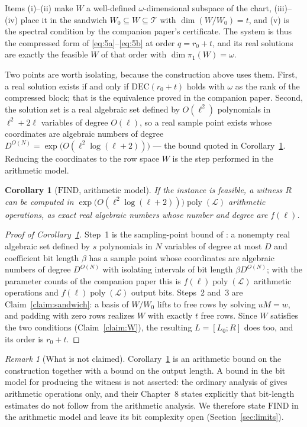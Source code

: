 ﻿\documentclass[journal]{IEEEtran}
\theoremstyle{plainn}
\newtheorem{cor}[thm]{Corollary}
\theoremstyle{remark}
\newtheorem{remark}{Remark}
\begin{document}
Items (i)--(ii) make $W$ a well-defined $\omega$-dimensional subspace of the chart, (iii)--(iv) place it
in the sandwich $W_0\subseteq W\subseteq\mathcal T$ with $\dim(W/W_0)=t$, and (v) is the spectral
condition by the companion paper's certificate. The system is thus the compressed form of
\eqref{eq:5a}--\eqref{eq:5b} at order $q=r_0+t$, and its real solutions are exactly the feasible $W$
of that order with $\dim\pi_1(W)=\omega$.

Two points are worth isolating, because the construction above uses them.
First, a real solution exists if and only if $\mathrm{DEC}(r_0+t)$ holds with $\omega$ as the rank of
the compressed block; that is the equivalence proved in the companion paper. Second, the solution set
is a real algebraic set defined by $O(\ell^2)$ polynomials in $\ell^2+2\ell$ variables of degree
$O(\ell)$, so a real sample point exists whose coordinates are algebraic numbers of degree
$D^{O(N)}=\exp\bigl(O(\ell^2\log(\ell+2))\bigr)$ --- the bound quoted in
Corollary~\ref{cor:find}. Reducing the coordinates to the row space $W$ is the step performed in the
arithmetic model.

\begin{cor}[$\mathrm{FIND}$, arithmetic model]\label{cor:find}
If the instance is feasible, a witness $R$ can be computed in
$\exp\bigl(O(\ell^2\log(\ell+2))\bigr)\operatorname{poly}(\mathcal L)$ arithmetic operations, as
exact real algebraic numbers whose number and degree are $f(\ell)$.
\end{cor}

\begin{proof}[Proof of Corollary~\ref{cor:find}]
Step~1 is the sampling-point bound of \cite[Ch.~13]{bpr06}: a nonempty real algebraic set defined by
$s$ polynomials in $N$ variables of degree at most $D$ and coefficient bit length $\beta$ has a sample
point whose coordinates are algebraic numbers of degree $D^{O(N)}$ with isolating intervals of bit
length $\beta D^{O(N)}$; with the parameter counts of the companion paper this is
$f(\ell)\operatorname{poly}(\mathcal L)$ arithmetic
operations and $f(\ell)\operatorname{poly}(\mathcal L)$ output bits. Steps~2 and~3 are
Claim~\ref{claim:sandwich}: a basis of $W/W_0$ lifts to free rows by solving $uM=w$, and padding with
zero rows realizes $W$ with exactly $t$ free rows. Since $W$ satisfies the two conditions
(Claim~\ref{claim:W}), the resulting $L=[L_0;R]$ does too, and its order is $r_0+t$.
\end{proof}

\begin{remark}[What is not claimed]\label{rem:find-bit}
Corollary~\ref{cor:find} is an arithmetic bound on the construction together with a bound on the
output length. A bound in the bit model for producing the witness is not asserted: the ordinary
analysis of \cite{bpr06} gives arithmetic operations only, and their Chapter~8 states explicitly
that bit-length estimates do not follow from the arithmetic analysis. We therefore state
$\mathrm{FIND}$ in the arithmetic model and leave its bit complexity open
(Section~\ref{sec:limits}).
\end{remark}
\end{document}
